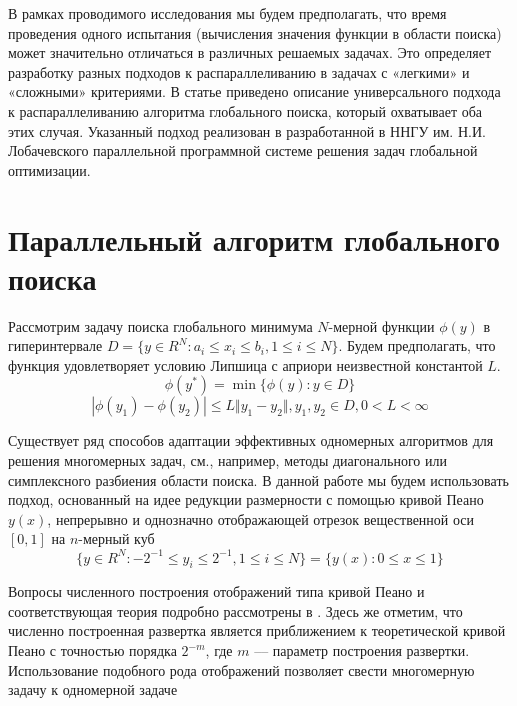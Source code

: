 \documentclass[a4paper]{article}
\begin{document}
\par
В рамках проводимого исследования мы будем предполагать, что время проведения одного испытания (вычисления значения функции в области поиска) может значительно отличаться в различных решаемых задачах. Это определяет разработку разных подходов к распараллеливанию в задачах с «легкими» и «сложными» критериями. В статье приведено описание универсального подхода к распараллеливанию алгоритма глобального поиска, который охватывает оба этих случая. Указанный подход реализован в разработанной в ННГУ им. Н.И. Лобачевского параллельной программной системе решения задач глобальной оптимизации.


\section{Параллельный алгоритм глобального поиска}
Рассмотрим задачу поиска глобального минимума \(N\)-мерной функции \(\phi(y)\) в гиперинтервале \(D=\{y\in R^N:a_i\leqslant x_i\leqslant{b_i}, 1\leqslant{i}\leqslant{N}\}\). Будем предполагать, что функция удовлетворяет условию Липшица с априори неизвестной константой \(L\).
\begin{equation}
\label{task}
\phi(y^*)=\min\{\phi(y):y\in D\}
\end{equation}
\begin{equation}
\label{lip}
|\phi(y_1)-\phi(y_2)|\leqslant L\Vert y_1-y_2\Vert,y_1,y_2\in D,0<L<\infty
\end{equation}
\par
Существует ряд способов адаптации эффективных одномерных алгоритмов для решения многомерных задач, см., например, методы диагонального \cite{sergKvaDiaPaper} или симплексного \cite{zilinsk} разбиения области поиска. В данной работе мы будем использовать подход, основанный на идее редукции размерности с помощью кривой Пеано \(y(x)\), непрерывно и однозначно отображающей отрезок вещественной оси \([0,1]\) на \(n\)-мерный куб 
\begin{displaymath}
\label{cube}
\lbrace y\in R^N:-2^{-1}\leqslant y_i\leqslant 2^{-1},1\leqslant i\leqslant N\rbrace=\{y(x):0\leqslant x\leqslant 1\}
\end{displaymath}
\par
Вопросы численного построения отображений типа кривой Пеано и соответствующая теория подробно рассмотрены в \cite{strSergOptBook}. Здесь же отметим, что численно построенная развертка является приближением к теоретической кривой Пеано с точностью порядка \(2^{-m}\), где \(m\) –-- параметр построения развертки. Использование подобного рода отображений позволяет свести многомерную задачу к одномерной задаче
\end{document}
